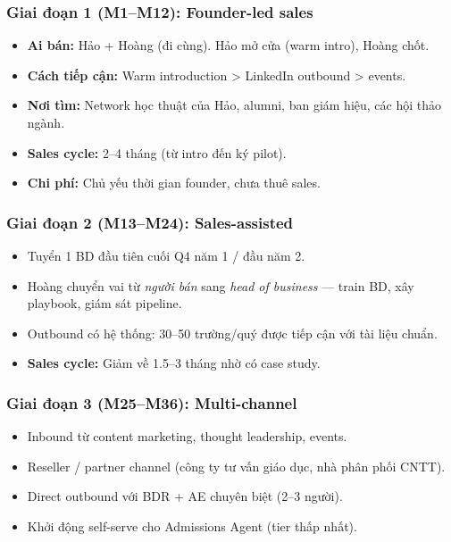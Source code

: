 \documentclass[11pt,a4paper]{article}
\begin{document}
\subsubsection*{Giai đoạn 1 (M1--M12): Founder-led sales}

\begin{itemize}
\item \textbf{Ai bán:} Hảo + Hoàng (đi cùng). Hảo mở cửa (warm intro), Hoàng chốt.
\item \textbf{Cách tiếp cận:} Warm introduction > LinkedIn outbound > events.
\item \textbf{Nơi tìm:} Network học thuật của Hảo, alumni, ban giám hiệu, các hội thảo ngành.
\item \textbf{Sales cycle:} 2--4 tháng (từ intro đến ký pilot).
\item \textbf{Chi phí:} Chủ yếu thời gian founder, chưa thuê sales.
\end{itemize}

\subsubsection*{Giai đoạn 2 (M13--M24): Sales-assisted}

\begin{itemize}
\item Tuyển 1 BD đầu tiên cuối Q4 năm 1 / đầu năm 2.
\item Hoàng chuyển vai từ \textit{người bán} sang \textit{head of business} --- train BD, xây playbook, giám sát pipeline.
\item Outbound có hệ thống: 30--50 trường/quý được tiếp cận với tài liệu chuẩn.
\item \textbf{Sales cycle:} Giảm về 1.5--3 tháng nhờ có case study.
\end{itemize}

\subsubsection*{Giai đoạn 3 (M25--M36): Multi-channel}

\begin{itemize}
\item Inbound từ content marketing, thought leadership, events.
\item Reseller / partner channel (công ty tư vấn giáo dục, nhà phân phối CNTT).
\item Direct outbound với BDR + AE chuyên biệt (2--3 người).
\item Khởi động self-serve cho Admissions Agent (tier thấp nhất).
\end{itemize}
\end{document}
